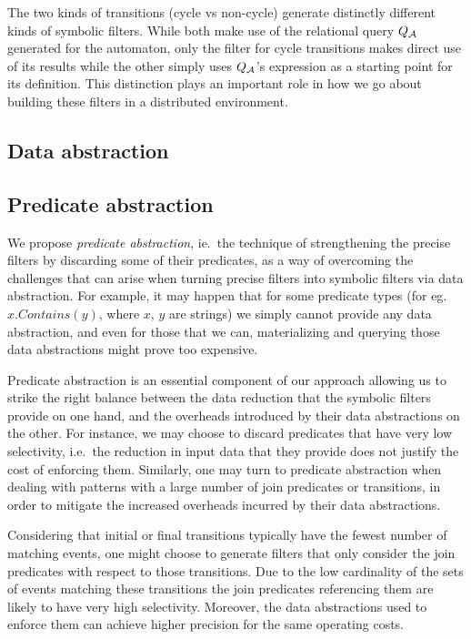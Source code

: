 The two kinds of transitions (cycle vs non-cycle) generate distinctly different 
kinds of symbolic filters. 
While both make use of the relational query $Q_{\mathcal{A}}$ generated for the 
automaton, only the filter for cycle transitions makes direct use of its results
while the other simply uses $Q_{\mathcal{A}}$'s expression as a starting point for its 
definition.
This distinction plays an important role in how we go about building these 
filters in a distributed environment.



\subsection{Data abstraction}
\label{sec:data_abstraction}


\subsection{Predicate abstraction}
\label{sec:pred_abstraction}


We propose {\em predicate abstraction}, ie.\ the technique of strengthening
 the
precise filters by discarding some of their predicates, as a way of
 overcoming
the challenges that can arise when turning precise filters into symbolic 
filters
via data abstraction.
For example, it may happen that for some predicate types
(for eg.\ $x.Contains(y)$, where $x$, $y$ are strings) we simply cannot
 provide
any data abstraction, and even for those that we can, materializing and
 querying
those data abstractions might prove too expensive.

Predicate abstraction is an essential component of our approach
allowing us to strike the right balance between the data reduction that the
symbolic filters provide on one hand, and the overheads introduced by their
data abstractions on the other.
For instance, we may choose to discard
predicates that have very low selectivity, i.e.\ the reduction in input 
data
that they provide does not justify the cost of enforcing them.
Similarly, one may turn to predicate abstraction when dealing with patterns
 with
a large number of join predicates or transitions, in order to mitigate the
increased overheads incurred by their data abstractions.

Considering that initial or final transitions typically have the fewest
number of matching events, one might choose to generate filters that only
consider the join predicates with respect to those transitions.
Due to the low cardinality of the sets of events matching these transitions 
the join predicates referencing them are likely to have very high 
selectivity.
Moreover, the data abstractions used to enforce them can achieve higher
precision for the same operating costs.












 
